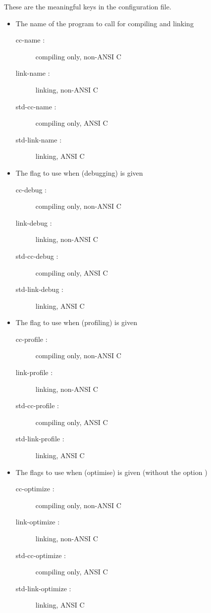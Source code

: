 These are the meaningful keys in the configuration file.
\renewcommand{\descriptionlabel}[1]%
{\texttt{#1}}


\begin{itemize}

\item The name of the program to call for compiling and linking
\begin{description}
\item    [cc-name :]  compiling only, non-ANSI C
\item    [link-name :] linking, non-ANSI C 
\item    [std-cc-name :] compiling only, ANSI C
\item    [std-link-name :] linking, ANSI C
\end{description}

\item The flag to use when  (debugging) is given 
\begin{description}
\item    [cc-debug :]  compiling only, non-ANSI C 
\item    [link-debug :]  linking, non-ANSI C
\item    [std-cc-debug :]  compiling only, ANSI C
\item    [std-link-debug :] linking, ANSI C
\end{description}

\item The flag to use when  (profiling) is given 
\begin{description}
\item    [cc-profile :] compiling only, non-ANSI C
\item    [link-profile :] linking, non-ANSI C
\item    [std-cc-profile :] compiling only, ANSI C
\item    [std-link-profile :] linking, ANSI C
\end{description}

\item The flags to use when  (optimise) is given (without the
option )
\begin{description}
\item    [cc-optimize :] compiling only, non-ANSI C
\item    [link-optimize :] linking, non-ANSI C
\item    [std-cc-optimize :] compiling only, ANSI C
\item    [std-link-optimize :] linking, ANSI C
\end{description}


\end{itemize}
